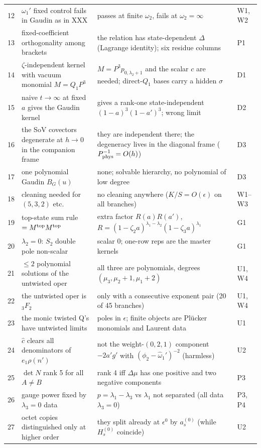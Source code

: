 \documentclass[11pt]{article}
\begin{document}
{\begin{longtable}{p{0.3cm}p{5.2cm}p{5.8cm}p{2.6cm}}
12 & $\omega_1'$ fixed control fails in Gaudin as in XXX & passes at finite $\omega_2$, fails at $\omega_2=\infty$ & W1, W2 \\
13 & fixed-coefficient orthogonality among brackets & the relation has state-dependent $\Delta$ (Lagrange identity); six residue columns & P1 \\
14 & $\zeta$-independent kernel with vacuum monomial $M=Q_1P^3$ & $M=P^3p_{0,\lambda_2+1}$ and the scalar $c$ are needed; direct-$Q_1$ bases carry a hidden $\sigma$ & D1 \\
15 & naive $t\to\infty$ at fixed $a$ gives the Gaudin kernel & gives a rank-one state-independent $(1-a)^3(1-a')^3$; wrong limit & D2 \\
16 & the SoV covectors degenerate at $h\to0$ in the companion frame & they are independent there; the degeneracy lives in the diagonal frame ($P^{-1}_{\rm phys}=O(h)$) & D3 \\
17 & one polynomial Gaudin $B_G(u)$ & none; solvable hierarchy, no polynomial of low degree & D3 \\
18 & cleaning needed for $(5,3,2)$ etc. & no cleaning anywhere ($K/S=O(\epsilon)$ on all branches) & W1--W3 \\
19 & top-state sum rule $=M^{\rm top}M^{\rm top}$ & extra factor $R(a)R(a')$, $R=(1-\zeta_2a)^{\lambda_1-\lambda_2}(1-\zeta_3a)^{\lambda_1}$ & G1 \\
20 & $\lambda_2=0$: $S_2$ double pole non-scalar & scalar $0$; one-row reps are the master kernels & G1 \\
21 & $\le2$ polynomial solutions of the untwisted oper & all three are polynomials, degrees $(\mu_3,\mu_2+1,\mu_1+2)$ & U1, W4 \\
22 & the untwisted oper is $_3F_2$ & only with a consecutive exponent pair (20 of 45 branches) & U1, W4 \\
23 & the monic twisted Q's have untwisted limits & poles in $\epsilon$; finite objects are Plücker monomials and Laurent data & U1 \\
24 & $\hat c$ clears all denominators of $e_1\rho(n')$ & not the weight-$(0,2,1)$ component $-2a'g'$ with $(\phi_2-\hat\omega_1')^{-2}$ (harmless) & U2 \\
25 & $\det N$ rank 5 for all $A\ne B$ & rank 4 iff $\Delta\mu$ has one positive and two negative components & P3 \\
26 & gauge power fixed by $\lambda_3=0$ data & $p=\lambda_1-\lambda_3$ vs $\lambda_1$ not separated (all data $\lambda_3=0$) & P3, P4 \\
27 & octet copies distinguished only at higher order & they split already at $\epsilon^0$ by $a_s^{(0)}$ (while $H_s^{(0)}$ coincide) & U2 \\
\end{longtable}}
\end{document}
